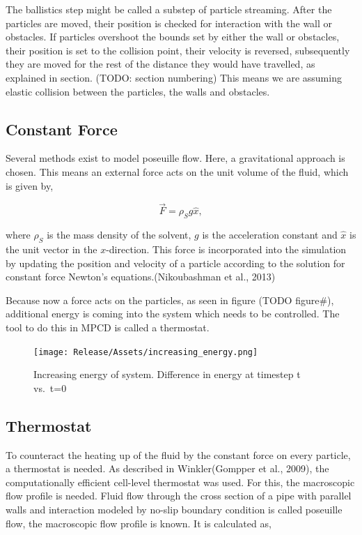 \documentclass[
]{article}
\begin{document}
The ballistics step might be called a substep of particle streaming.
After the particles are moved, their position is checked for interaction
with the wall or obstacles. If particles overshoot the bounds set by
either the wall or obstacles, their position is set to the collision
point, their velocity is reversed, subsequently they are moved for the
rest of the distance they would have travelled, as explained in section.
(TODO: section numbering) This means we are assuming elastic collision
between the particles, the walls and obstacles.

\hypertarget{constant-force}{%
\subsection{Constant Force}\label{constant-force}}

Several methods exist to model poseuille flow. Here, a gravitational
approach is chosen. This means an external force acts on the unit volume
of the fluid, which is given by,

\begin{equation}
\vec{F} = \rho_S g \hat x,
\end{equation}

where \(\rho_S\) is the mass density of the solvent, \(g\) is the
acceleration constant and \(\hat x\) is the unit vector in the
\(x\)-direction. This force is incorporated into the simulation by
updating the position and velocity of a particle according to the
solution for constant force Newton's equations.(Nikoubashman et al.,
2013)

Because now a force acts on the particles, as seen in figure (TODO
figure\#), additional energy is coming into the system which needs to be
controlled. The tool to do this in MPCD is called a thermostat.

\begin{figure}
\centering
\texttt{[image: Release/Assets/increasing\_energy.png]}
\caption{Increasing energy of system. Difference in energy at timestep t
vs.~t=0}
\end{figure}

\hypertarget{thermostat}{%
\subsection{Thermostat}\label{thermostat}}

To counteract the heating up of the fluid by the constant force on every
particle, a thermostat is needed. As described in Winkler(Gompper et
al., 2009), the computationally efficient cell-level thermostat was
used. For this, the macroscopic flow profile is needed. Fluid flow
through the cross section of a pipe with parallel walls and interaction
modeled by no-slip boundary condition is called poseuille flow, the
macroscopic flow profile is known. It is calculated as,
\end{document}
